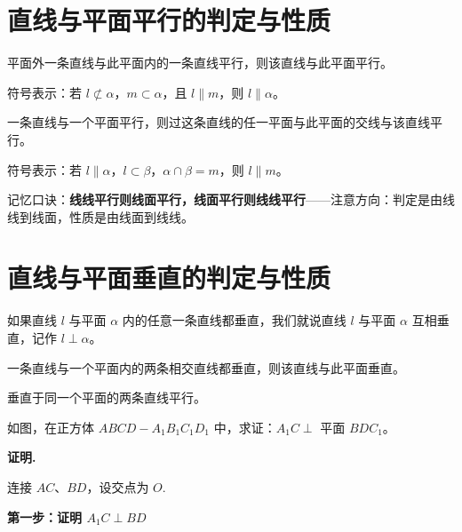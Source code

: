 \section{直线与平面平行的判定与性质}

\begin{theorem}[线面平行的判定定理]
平面外一条直线与此平面内的一条直线平行，则该直线与此平面平行。

符号表示：若 $l \not\subset \alpha$，$m \subset \alpha$，且 $l \parallel m$，则 $l \parallel \alpha$。
\end{theorem}

\begin{theorem}[线面平行的性质定理]
一条直线与一个平面平行，则过这条直线的任一平面与此平面的交线与该直线平行。

符号表示：若 $l \parallel \alpha$，$l \subset \beta$，$\alpha \cap \beta = m$，则 $l \parallel m$。
\end{theorem}

\begin{note}
记忆口诀：\textbf{线线平行则线面平行，线面平行则线线平行}——注意方向：判定是由线线到线面，性质是由线面到线线。
\end{note}

\section{直线与平面垂直的判定与性质}

\begin{definition}[线面垂直]
如果直线 $l$ 与平面 $\alpha$ 内的任意一条直线都垂直，我们就说直线 $l$ 与平面 $\alpha$ 互相垂直，记作 $l \perp \alpha$。
\end{definition}

\begin{theorem}[线面垂直的判定定理]
一条直线与一个平面内的两条相交直线都垂直，则该直线与此平面垂直。
\end{theorem}

\begin{theorem}[线面垂直的性质定理]
垂直于同一个平面的两条直线平行。
\end{theorem}

\begin{example}
如图，在正方体 $ABCD-A_1B_1C_1D_1$ 中，求证：$A_1C \perp$ 平面 $BDC_1$。
\end{example}

\textbf{证明.}

连接 $AC$、$BD$，设交点为 $O$.

\textbf{第一步：证明 $A_1C \perp BD$}

